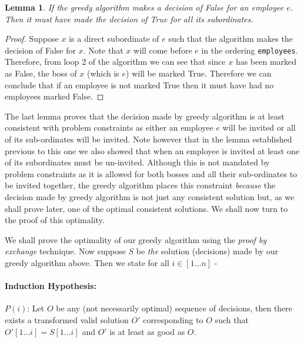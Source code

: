 \documentclass[answers]{exam}
\newtheorem{lemma}{Lemma}
\begin{document}
\begin{questions}
\begin{solution}
\begin{lemma}
If the greedy algorithm makes a decision of False for an employee $e$. Then it must have made the decision of True for all its subordinates.
\end{lemma}
\begin{proof}
Suppose $x$ is a direct subordinate of $e$ such that the algorithm makes the decision of False for $x$. Note that $x$ will come before $e$ in the ordering \texttt{employees}. Therefore, from loop 2 of the algorithm we can see that since $x$ has been marked as False, the boss of $x$ (which is $e$) will be marked True. Therefore we can conclude that if an employee is not marked True then it must have had no employees marked False.
\end{proof}
The last lemma proves that the decision made by greedy algorithm is at least consistent with problem constraints as either an employee $e$ will be invited or all of its sub-ordinates will be invited. Note however that in the lemma established previous to this one we also showed that when an employee is invited at least one of its subordinates must be un-invited. Although this is not mandated by problem constraints as it is allowed for both bosses and all their sub-ordinates to be invited together, the greedy algorithm places this constraint \emph{because} the decision made by greedy algorithm is not just any consistent solution but, as we shall prove later, one of the optimal consistent solutions. We shall now turn to the proof of this optimality.

We shall prove the optimality of our greedy algorithm using the \emph{proof by exchange} technique. Now suppose $S$ be \emph{the} solution (decisions) made by our greedy algorithm above. Then we state for all $i \in [1 \ldots n]$ -

\paragraph{Induction Hypothesis:} $P(i)$: Let $O$ be any (not necessarily optimal) sequence of decisions, then there exists a transformed valid solution $O'$ corresponding to $O$ such that $O'[1 \ldots i] = S[1 \ldots i]$ and $O'$ is at least as good as $O$.


\end{solution}
\end{questions}
\end{document}
